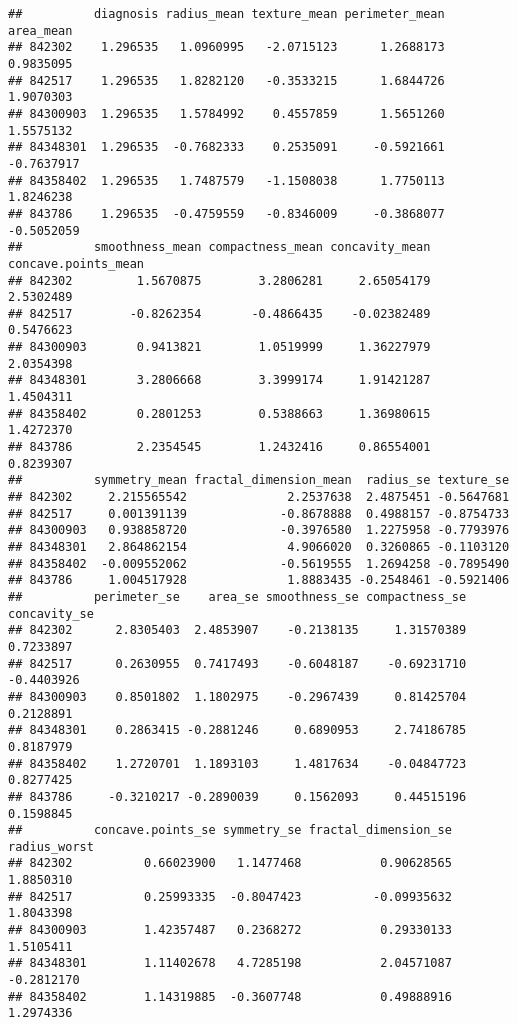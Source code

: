 \documentclass[
]{article}
\begin{document}
\begin{verbatim}
##          diagnosis radius_mean texture_mean perimeter_mean  area_mean
## 842302    1.296535   1.0960995   -2.0715123      1.2688173  0.9835095
## 842517    1.296535   1.8282120   -0.3533215      1.6844726  1.9070303
## 84300903  1.296535   1.5784992    0.4557859      1.5651260  1.5575132
## 84348301  1.296535  -0.7682333    0.2535091     -0.5921661 -0.7637917
## 84358402  1.296535   1.7487579   -1.1508038      1.7750113  1.8246238
## 843786    1.296535  -0.4759559   -0.8346009     -0.3868077 -0.5052059
##          smoothness_mean compactness_mean concavity_mean concave.points_mean
## 842302         1.5670875        3.2806281     2.65054179           2.5302489
## 842517        -0.8262354       -0.4866435    -0.02382489           0.5476623
## 84300903       0.9413821        1.0519999     1.36227979           2.0354398
## 84348301       3.2806668        3.3999174     1.91421287           1.4504311
## 84358402       0.2801253        0.5388663     1.36980615           1.4272370
## 843786         2.2354545        1.2432416     0.86554001           0.8239307
##          symmetry_mean fractal_dimension_mean  radius_se texture_se
## 842302     2.215565542              2.2537638  2.4875451 -0.5647681
## 842517     0.001391139             -0.8678888  0.4988157 -0.8754733
## 84300903   0.938858720             -0.3976580  1.2275958 -0.7793976
## 84348301   2.864862154              4.9066020  0.3260865 -0.1103120
## 84358402  -0.009552062             -0.5619555  1.2694258 -0.7895490
## 843786     1.004517928              1.8883435 -0.2548461 -0.5921406
##          perimeter_se    area_se smoothness_se compactness_se concavity_se
## 842302      2.8305403  2.4853907    -0.2138135     1.31570389    0.7233897
## 842517      0.2630955  0.7417493    -0.6048187    -0.69231710   -0.4403926
## 84300903    0.8501802  1.1802975    -0.2967439     0.81425704    0.2128891
## 84348301    0.2863415 -0.2881246     0.6890953     2.74186785    0.8187979
## 84358402    1.2720701  1.1893103     1.4817634    -0.04847723    0.8277425
## 843786     -0.3210217 -0.2890039     0.1562093     0.44515196    0.1598845
##          concave.points_se symmetry_se fractal_dimension_se radius_worst
## 842302          0.66023900   1.1477468           0.90628565    1.8850310
## 842517          0.25993335  -0.8047423          -0.09935632    1.8043398
## 84300903        1.42357487   0.2368272           0.29330133    1.5105411
## 84348301        1.11402678   4.7285198           2.04571087   -0.2812170
## 84358402        1.14319885  -0.3607748           0.49888916    1.2974336

\end{verbatim}
\end{document}

